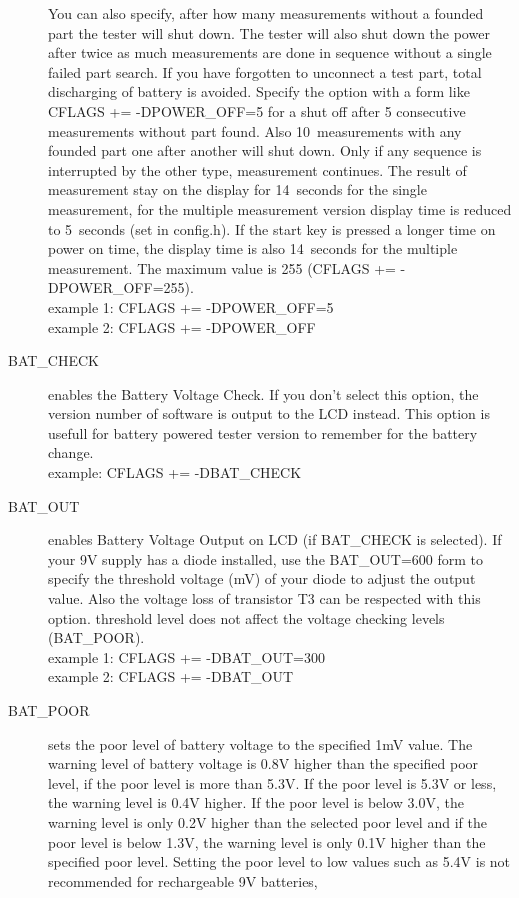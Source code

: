 \begin{description}
You can also specify, after how many measurements without a founded part the tester will shut down.
The tester will also shut down the power after twice as much measurements are done in sequence without a
single failed part search. If you have forgotten to unconnect a test part, total discharging of battery is avoided. 
Specify the option with a form like CFLAGS += -DPOWER\_OFF=5 for a shut off after 5 consecutive measurements
without part found. Also 10~measurements with any founded part one after another will shut down.
Only if any sequence is interrupted by the other type, measurement continues.
The result of measurement stay on the display for 14~seconds for the single measurement, for the
multiple measurement version display time is reduced to 5~seconds (set in config.h).
If the start key is pressed a longer time on power on time, the display time is also 14~seconds for the multiple measurement.
The maximum value is 255 (CFLAGS += -DPOWER\_OFF=255).\\
example 1: CFLAGS += -DPOWER\_OFF=5\\
example 2: CFLAGS += -DPOWER\_OFF
  \item[BAT\_CHECK] enables the Battery Voltage Check. If you don't select this option, the version number of
software is output to the LCD instead.
This option is usefull for battery powered tester version to remember for the battery change.\\
example: CFLAGS += -DBAT\_CHECK
  \item[BAT\_OUT] enables Battery Voltage Output on LCD (if BAT\_CHECK is selected).
 If your 9V supply has a diode installed, use the BAT\_OUT=600 form to specify the threshold voltage (mV) of your diode
to adjust the output value.
Also the voltage loss of transistor T3 can be respected with this option.
 threshold level does not affect the voltage checking levels (BAT\_POOR).\\
example 1: CFLAGS += -DBAT\_OUT=300\\
example 2: CFLAGS += -DBAT\_OUT
  \item[BAT\_POOR] sets the poor level of battery voltage to the specified 1mV value.
The warning level of battery voltage is 0.8V higher than the specified poor level, if the poor level is more than 5.3V.
If the poor level is 5.3V or less, the warning level is 0.4V higher. If the poor level is below 3.0V, the
warning level is only 0.2V higher than the selected poor level and if the poor level is below 1.3V, the
warning level is only 0.1V higher than the specified poor level.
Setting the poor level to low values such as 5.4V is not recommended for rechargeable 9V batteries,

\end{description}
